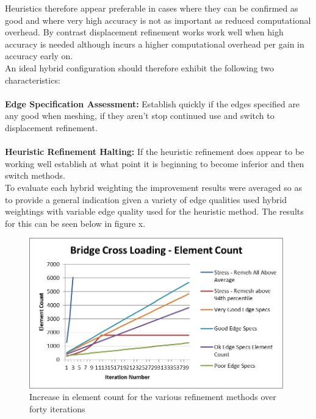 \noindent
Heuristics therefore appear preferable in cases where they can be confirmed as good and where very high accuracy is not as important as reduced computational overhead. By contrast displacement refinement works work well when high accuracy is needed although incurs a higher computational overhead per gain in accuracy early on. \\ 

\noindent
An ideal hybrid configuration should therefore exhibit the following two characteristics:\\ \\ 
\noindent
\textbf{Edge Specification Assessment:} Establish quickly if the edges specified are any good when meshing, if they aren't stop continued use and switch to displacement refinement. \\ \\ 
\noindent
\textbf{Heuristic Refinement Halting:} If the heuristic refinement does appear to be working well establish at what point it is beginning to become inferior and then switch methods. \\



\noindent
To evaluate each hybrid weighting the improvement results were averaged so as to provide a general indication given a variety of edge qualities used hybrid weightings with variable edge quality used for the heuristic method. The results for this can be seen below in figure x. \\

\begin{figure}[!h]
  \centerline{\includegraphics[width=110mm, scale=1]{../Graphics/Graphs/BridgeCrossLoadingElementCount.png}}
  \caption{Increase in element count for the various refinement methods over forty iterations}
  \label{fig:sub1}
\end{figure}


